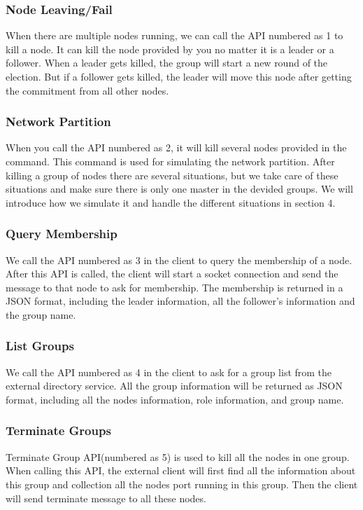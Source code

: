 \documentclass[a4paper,11pt]{article}
\begin{document}
\subsubsection{Node Leaving/Fail}
When there are multiple nodes running, we can call the API numbered as 1 to kill a node. It can kill the node provided by you no matter it is a leader or a follower. When a leader gets killed, the group will start a new round of the election. But if a follower gets killed, the leader will move this node after getting the commitment from all other nodes.
\subsubsection{Network Partition}
When you call the API numbered as 2, it will kill several nodes provided in the command. This command is used for simulating the network partition. After killing a group of nodes there are several situations, but we take care of these situations and make sure there is only one master in the devided groups. We will introduce how we simulate it and handle the different situations in section 4.
\subsubsection{Query Membership}
We call the API numbered as 3 in the client to query the membership of a node. After this API is called, the client will start a socket connection and send the message to that node to ask for membership. The membership is returned in a JSON format, including the leader information, all the follower's information and the group name.
\subsubsection{List Groups}
We call the API numbered as 4 in the client to ask for a group list from the external directory service. All the group information will be returned as JSON format, including all the nodes information, role information, and group name.
\subsubsection{Terminate Groups}
Terminate Group API(numbered as 5) is used to kill all the nodes in one group. When calling this API, the external client will first find all the information about this group and collection all the nodes port running in this group. Then the client will send terminate message to all these nodes.
\end{document}
